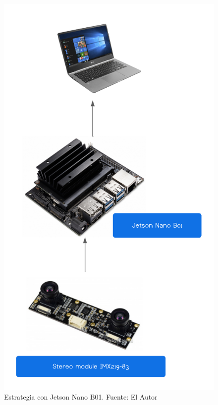 \begin{figure}[H]
    \centering
    \includegraphics[scale=0.5]{Recursos/estrategia_jestson_nano.png}
    \caption[Estrategia con Jetson Nano B01.]{Estrategia con Jetson Nano B01. {\footnotesize Fuente: El Autor}}
    \label{estrategia_jetson}
\end{figure}
